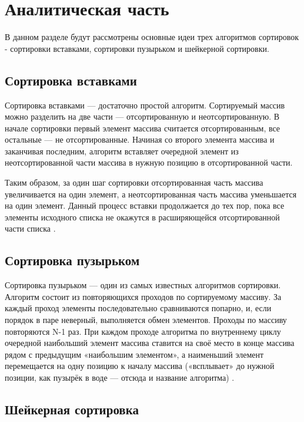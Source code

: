\chapter{Аналитическая часть}

В данном разделе будут рассмотрены основные идеи трех алгоритмов сортировок - сортировки вставками, сортировки пузырьком и шейкерной сортировки.

\section{Сортировка вставками}

 Сортировка вставками — достаточно простой алгоритм. Сортируемый массив можно разделить на две части — отсортированную и неотсортированную. В начале сортировки первый элемент массива считается отсортированным, все остальные — не отсортированные. Начиная со второго элемента массива и заканчивая последним, алгоритм вставляет очередной элемент из неотсортированной части массива в нужную позицию в отсортированной части. 
 
 Таким образом, за один шаг сортировки отсортированная часть массива увеличивается на один элемент, а неотсортированная часть массива уменьшается на один элемент. Данный процесс вставки продолжается до тех пор, пока все элементы исходного списка не окажутся в расширяющейся отсортированной части списка \cite{article_insert}.


\section{Сортировка пузырьком}

Сортировка пузырьком — один из самых известных алгоритмов сортировки. Алгоритм  состоит  из  повторяющихся  проходов  по  сортируемому массиву. За каждый проход элементы последовательно сравниваются попарно, и, если порядок в паре неверный, выполняется обмен элементов. Проходы  по  массиву повторяются  N-1 раз.  При каждом  проходе  алгоритма  по  внутреннему  циклу  очередной  наибольший  элемент  массива ставится на своё место в конце массива рядом с предыдущим «наибольшим элементом», а наименьший элемент перемещается на одну позицию к  началу  массива  («всплывает»  до  нужной  позиции,  как  пузырёк  в воде — отсюда  и  название алгоритма) \cite{first_book}.

\section{Шейкерная сортировка}

